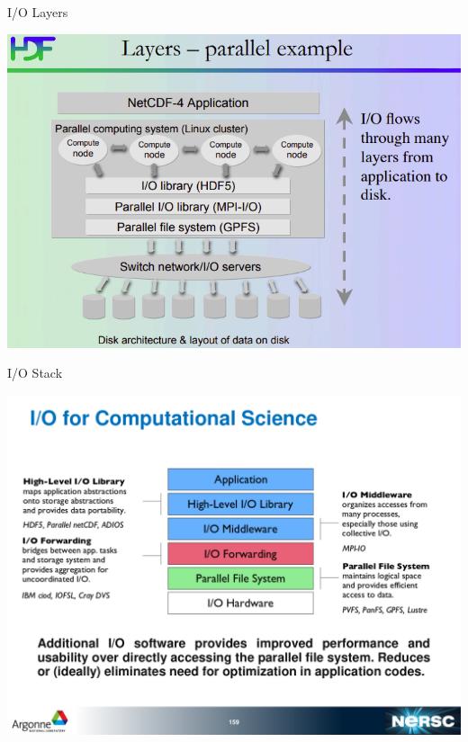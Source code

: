 \documentclass[compress,11pt,xcolor=svgnames,aspectratio=169]{beamer}
\begin{document}
\begin{frame}[t]{I/O Layers}

\begin{center}
\includegraphics[scale=0.5]{fig/io-layers}
\end{center}


\end{frame}

\begin{frame}[t]{I/O Stack}

\begin{center}
\includegraphics[scale=0.5]{fig/io-stack2}
\end{center}


\end{frame}
\end{document}
